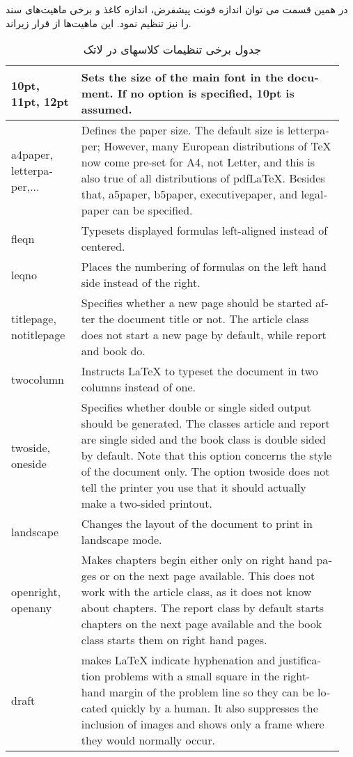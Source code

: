  در همین قسمت می توان اندازه فونت پیشفرض، اندازه کاغذ و برخی ماهیت‌های سند را نیز تنظیم نمود. این ماهیت‌ها از قرار زیراند.
   \begin{table}[h!]
    \begin{latin}
  \begin{center}
 \begin{tabular}{|m{0.2\linewidth}|m{0.75\linewidth}|}
 \hline
 10pt, 11pt, 12pt &Sets the size of the main font in the document. If no option is specified, 10pt is assumed. \\\hline
a4paper, letterpaper,...&Defines the paper size. The default size is letterpaper; However, many European distributions of TeX now come pre-set for A4, not Letter, and this is also true of all distributions of pdfLaTeX. Besides that, a5paper, b5paper, executivepaper, and legalpaper can be specified. \\\hline
fleqn &Typesets displayed formulas left-aligned instead of centered. \\\hline
leqno &Places the numbering of formulas on the left hand side instead of the right. \\\hline
titlepage, notitlepage&Specifies whether a new page should be started after the document title or not. The article class does not start a new page by default, while report and book do.\\\hline
twocolumn &Instructs LaTeX to typeset the document in two columns instead of one.\\\hline
twoside, oneside&Specifies whether double or single sided output should be generated. The classes article and report are single sided and the book class is double sided by default. Note that this option concerns the style of the document only. The option twoside does not tell the printer you use that it should actually make a two-sided printout.\\\hline
landscape &Changes the layout of the document to print in landscape mode.\\\hline
openright, openany &Makes chapters begin either only on right hand pages or on the next page available. This does not work with the article class, as it does not know about chapters. The report class by default starts chapters on the next page available and the book class starts them on right hand pages.\\\hline
draft &makes LaTeX indicate hyphenation and justification problems with a small square in the right-hand margin of the problem line so they can be located quickly by a human. It also suppresses the inclusion of images and shows only a frame where they would normally occur.
\\\hline
  \end{tabular}
    \end{center}
 \end{latin}
  \caption{جدول برخی تنظیمات کلاسهای در لاتک}
 \end{table}
 
